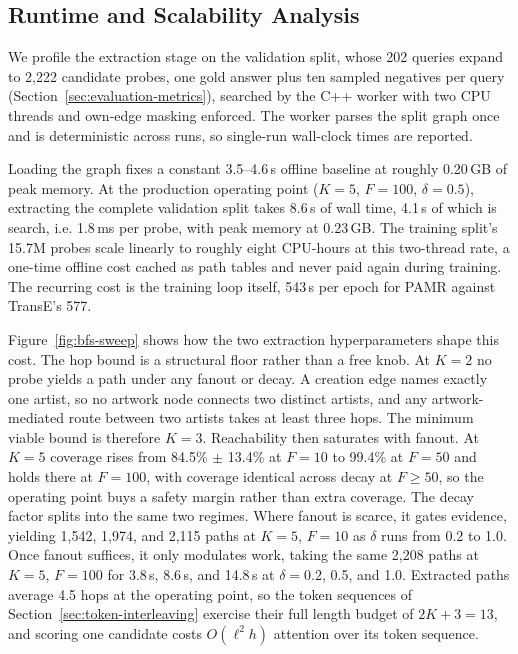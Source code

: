 \documentclass[runningheads]{llncs}
\begin{document}
\subsection{Runtime and Scalability Analysis}
\label{sec:runtime}

We profile the extraction stage on the validation split, whose 202
queries expand to 2,222 candidate probes, one gold answer plus ten
sampled negatives per query (Section~\ref{sec:evaluation-metrics}),
searched by the C++ worker with two CPU threads and own-edge masking
enforced. The worker parses the split graph once and is deterministic
across runs, so single-run wall-clock times are reported.

Loading the graph fixes a constant 3.5--4.6\,s offline baseline at
roughly 0.20\,GB of peak memory. At the production
operating point ($K = 5$, $F = 100$, $\delta = 0.5$), extracting the
complete validation split takes 8.6\,s of wall time, 4.1\,s of which is
search, i.e. 1.8\,ms per probe, with peak memory at 0.23\,GB. The
training split's 15.7M probes scale linearly to roughly eight
CPU-hours at this two-thread rate, a one-time offline cost cached as
path tables and never paid again during training. The recurring cost is
the training loop itself, 543\,s per epoch for PAMR against TransE's
577.

Figure~\ref{fig:bfs-sweep} shows how the two extraction hyperparameters
shape this cost. The hop bound is a structural floor rather than a
free knob. At $K = 2$ no probe yields a path under any fanout or decay. A
creation edge names exactly one artist, so no artwork node connects
two distinct artists, and any artwork-mediated route between two
artists takes at least three hops. The minimum viable bound
is therefore $K = 3$. Reachability then saturates with fanout. At
$K = 5$ coverage rises from 84.5\% $\pm$ 13.4\% at $F = 10$ to 99.4\% at
$F = 50$ and holds there at $F = 100$, with coverage identical across
decay at $F \geq 50$, so the operating point buys a
safety margin rather than extra coverage. The decay factor splits into
the same two regimes. Where fanout is scarce, it gates evidence,
yielding 1{,}542, 1{,}974, and 2{,}115 paths at $K = 5$, $F = 10$ as
$\delta$ runs from 0.2 to 1.0. Once fanout suffices, it only modulates
work, taking the same 2{,}208 paths at $K = 5$, $F = 100$ for
3.8\,s, 8.6\,s, and 14.8\,s at $\delta = 0.2$, 0.5, and 1.0. Extracted
paths average 4.5 hops at the operating point, so the token sequences
of Section~\ref{sec:token-interleaving} exercise their full length
budget of $2K + 3 = 13$, and scoring one candidate costs $O(\ell^{2}h)$
attention over its token sequence.
\end{document}
